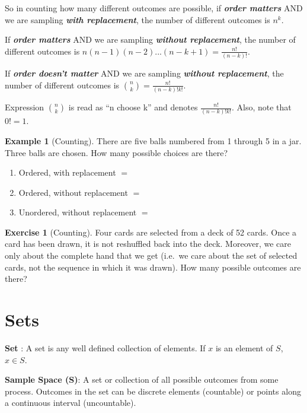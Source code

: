 \documentclass[
]{book}
\theoremstyle{definition}
\theoremstyle{definition}
\newtheorem{example}{Example}[chapter]
\theoremstyle{definition}
\newtheorem{exercise}{Exercise}[chapter]
\theoremstyle{remark}
\begin{document}
So in counting how many different outcomes are possible, if \textbf{\emph{order matters}} AND we are sampling \textbf{\emph{with replacement}}, the number of different outcomes is \(n^k\).

If \textbf{\emph{order matters}} AND we are sampling \textbf{\emph{without replacement}}, the number of different outcomes is \(n(n-1)(n-2)...(n-k+1)=\frac{n!}{(n-k)!}\).

If \textbf{\emph{order doesn't matter}} AND we are sampling \textbf{\emph{without replacement}}, the number of different outcomes is \(\binom{n}{k} = \frac{n!}{(n-k)!k!}\).

Expression \(\binom{n}{k}\) is read as ``n choose k'' and denotes \(\frac{n!}{(n-k)!k!}\). Also, note that \(0! = 1\).

\begin{example}[Counting]
\protect\hypertarget{exm:counting}{}{\label{exm:counting} {} }
There are five balls numbered from 1 through 5 in a jar. Three balls are chosen. How many possible choices are there?

\begin{enumerate}
\def\labelenumi{\arabic{enumi}.}
\item
  Ordered, with replacement \(=\)
\item
  Ordered, without replacement \(=\)
\item
  Unordered, without replacement \(=\)
\end{enumerate}
\end{example}

\begin{exercise}[Counting]
\protect\hypertarget{exr:counting1}{}{\label{exr:counting1} {} }
Four cards are selected from a deck of 52 cards. Once a card has been drawn, it is not reshuffled back into the deck. Moreover, we care only about the complete hand that we get (i.e.~we care about the set of selected cards, not the sequence in which it was drawn). How many possible outcomes are there?
\end{exercise}

\hypertarget{setoper}{%
\section{Sets}\label{setoper}}

\textbf{Set} : A set is any well defined collection of elements. If \(x\) is an element of \(S\), \(x \in S\).

\textbf{Sample Space (S)}: A set or collection of all possible outcomes from some process. Outcomes in the set can be discrete elements (countable) or points along a continuous interval (uncountable).
\end{document}
